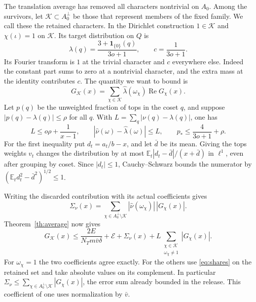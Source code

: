 \documentclass[11pt,letterpaper]{article}
\newcommand{\E}{\mathbb E}
\newcommand{\ind}{\mathbf 1}
\newcommand{\Rea}{\operatorname{Re}}
\numberwithin{equation}{section}
\begin{document}
The translation average has removed all characters nontrivial on \(A_0\). Among the survivors, let \(\mathcal K\subset A_0^\perp\) be those that represent members of the fixed family. We call these the retained characters. In the Dirichlet construction \(1\in\mathcal K\) and \(\chi(\iota)=1\) on \(\mathcal K\). Its target distribution on \(Q\) is
\[
 \lambda(q)=\frac{3+\ind_{\{0\}}(q)}{3o+1},\qquad c=\frac1{3o+1}.
\]
Its Fourier transform is \(1\) at the trivial character and \(c\) everywhere else. Indeed the constant part sums to zero at a nontrivial character, and the extra mass at the identity contributes \(c\). The quantity we want to bound is
\[
        G_{\mathcal K}(x)=\sum_{\chi\in\mathcal K}
                       \widehat\lambda(\omega_\chi)\Rea G_\chi(x).
\]
Let \(p(q)\) be the unweighted fraction of tops in the coset \(q\), and suppose \(|p(q)-\lambda(q)|\le \rho\) for all \(q\). With \(L=\sum_q|\nu(q)-\lambda(q)|\), one has
\begin{equation}\label{eq:shares}
 L\le o\rho+\frac{1}{x-1},\qquad
 |\widehat\nu(\omega)-\widehat\lambda(\omega)|\le L,\qquad
 p_*\le\frac4{3o+1}+\rho .
\end{equation}
For the first inequality put \(d_t=a_t/b-x\), and let \(\bar d\) be its mean. Giving the tops weights \(v_t\) changes the distribution by at most \(\E_t|d_t-\bar d|/(x+\bar d)\) in \(\ell^1\), even after grouping by coset. Since \(|d_t|\le1\), Cauchy--Schwarz bounds the numerator by \((\E_t d_t^2-\bar d^2)^{1/2}\le1\).

Writing the discarded contribution with its actual coefficients gives
\[
  \Sigma_\nu(x)=
    \sum_{\chi\in A_0^\perp\setminus\mathcal K}
          |\widehat\nu(\omega_\chi)|\,|G_\chi(x)|.
\]
Theorem~\ref{th:average} now gives
\begin{equation}\label{eq:retained}
 G_{\mathcal K}(x)
 \le \frac{2E}{N_Tm\bar v\delta}+\mathcal E+\Sigma_\nu(x)
       +L\!\!\sum_{\substack{\chi\in\mathcal K\\\omega_\chi\ne1}}\!\!|G_\chi(x)|.
\end{equation}
For \(\omega_\chi=1\) the two coefficients agree exactly. For the others use \eqref{eq:shares} on the retained set and take absolute values on its complement. In particular \(\Sigma_\nu\le\sum_{\chi\in A_0^\perp\setminus\mathcal K}|G_\chi(x)|\), the error sum already bounded in the release. This coefficient of one uses normalization by \(\bar v\).
\end{document}
